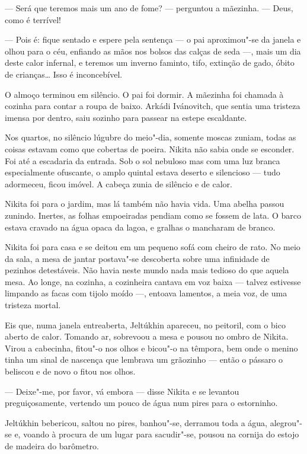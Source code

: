 --- Será que teremos mais um ano de fome? --- perguntou a mãezinha. ---
Deus, como é terrível!

--- Pois é: fique sentado e espere pela sentença --- o pai aproximou"-se
da janela e olhou para o céu, enfiando as mãos nos bolsos das calças de
seda ---, mais um dia deste calor infernal, e teremos um inverno
faminto, tifo, extinção de gado, óbito de crianças\ldots{} Isso é
inconcebível.

O almoço terminou em silêncio. O pai foi dormir. A mãezinha foi chamada
à cozinha para contar a roupa de baixo. Arkádi Ivánovitch, que sentia uma
tristeza imensa por dentro, saiu sozinho para passear na estepe
escaldante.

Nos quartos, no silêncio lúgubre do meio"-dia, somente moscas zuniam,
todas as coisas estavam como que cobertas de poeira. Nikita não sabia
onde se esconder. Foi até a escadaria da entrada. Sob o sol nebuloso mas
com uma luz branca especialmente ofuscante, o amplo quintal estava
deserto e silencioso --- tudo adormeceu, ficou imóvel. A cabeça zunia de
silêncio e de calor.

Nikita foi para o jardim, mas lá também não havia vida. Uma abelha
passou zunindo. Inertes, as folhas empoeiradas pendiam como se fossem de
lata. O barco estava cravado na água opaca da lagoa, e gralhas o
mancharam de branco.

Nikita foi para casa e se deitou em um pequeno sofá com cheiro de rato.
No meio da sala, a mesa de jantar postava"-se descoberta sobre uma
infinidade de pezinhos detestáveis. Não havia neste mundo nada mais
tedioso do que aquela mesa. Ao longe, na cozinha, a cozinheira cantava
em voz baixa --- talvez estivesse limpando as facas com tijolo moído ---,
entoava lamentos, a meia voz, de uma tristeza mortal.

Eis que, numa janela entreaberta, Jeltúkhin apareceu, no peitoril, com o
bico aberto de calor. Tomando ar, sobrevoou a mesa e pousou no ombro de
Nikita. Virou a cabecinha, fitou"-o nos olhos e bicou"-o na têmpora,
bem onde o menino tinha um sinal de nascença que lembrava um grãozinho
--- então o pássaro o beliscou e de novo o fitou nos olhos.

--- Deixe"-me, por favor, vá embora --- disse Nikita e se levantou
preguiçosamente, vertendo um pouco de água num pires para o estorninho.

Jeltúkhin bebericou, saltou no pires, banhou"-se, derramou toda a água, alegrou"-se e, voando à procura de um lugar para sacudir"-se, pousou na cornija do estojo de madeira do barômetro.

